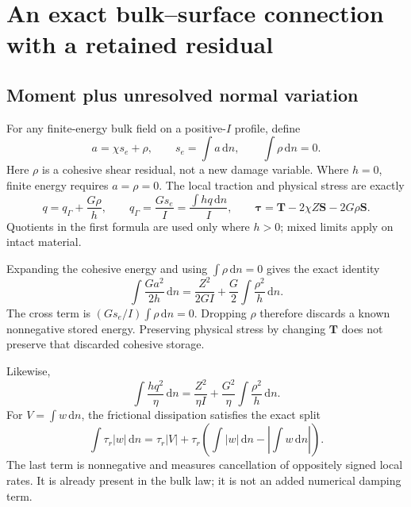 \documentclass[11pt,a4paper]{article}
\numberwithin{equation}{section}
\newcommand{\dd}{\,\mathrm d}
\newcommand{\Sg}{\bm S}
\newcommand{\T}{\bm T}
\newcommand{\ta}{\bm\tau}
\begin{document}
\section{An exact bulk--surface connection with a retained residual}
\label{sec:residual}

\subsection{Moment plus unresolved normal variation}

For any finite-energy bulk field on a positive-$I$ profile, define
\begin{equation}
 \boxed{a=\chi s_e+\rho,\qquad
       s_e=\int a\dd n,\qquad \int\rho\dd n=0.}
 \label{eq:rho}
\end{equation}
Here $\rho$ is a cohesive shear residual, not a new damage variable.
Where $h=0$, finite energy requires $a=\rho=0$.
The local traction and physical stress are exactly
\begin{equation}
 q=q_\Gamma+\frac{G\rho}{h},\qquad
 q_\Gamma=\frac{G s_e}{I}
          =\frac{\int hq\dd n}{I},\qquad
 \ta=\T-2\chi Z\Sg-2G\rho\Sg.
 \label{eq:rhostress}
\end{equation}
Quotients in the first formula are used only where $h>0$; mixed limits apply
on intact material.

Expanding the cohesive energy and using $\int\rho\dd n=0$ gives the exact identity
\begin{equation}
 \boxed{\int\frac{Ga^2}{2h}\dd n
   =\frac{Z^2}{2GI}+\frac G2\int\frac{\rho^2}{h}\dd n.}
 \label{eq:variance}
\end{equation}
The cross term is $(G s_e/I)\int\rho\dd n=0$.
Dropping $\rho$ therefore discards a known nonnegative stored energy.
Preserving physical stress by changing $\T$ does not preserve that discarded
cohesive storage.

Likewise,
\begin{equation}
 \int\frac{h q^2}{\eta}\dd n
 =\frac{Z^2}{\eta I}+\frac{G^2}{\eta}\int\frac{\rho^2}{h}\dd n.
 \label{eq:rhodiss}
\end{equation}
For $V=\int w\dd n$, the frictional dissipation satisfies the exact split
\begin{equation}
 \int\tau_r|w|\dd n
 =\tau_r|V|+
   \tau_r\left(\int|w|\dd n-\left|\int w\dd n\right|\right).
 \label{eq:frictionexcess}
\end{equation}
The last term is nonnegative and measures cancellation of oppositely signed
local rates. It is already present in the bulk law; it is not an added
numerical damping term.
\end{document}
